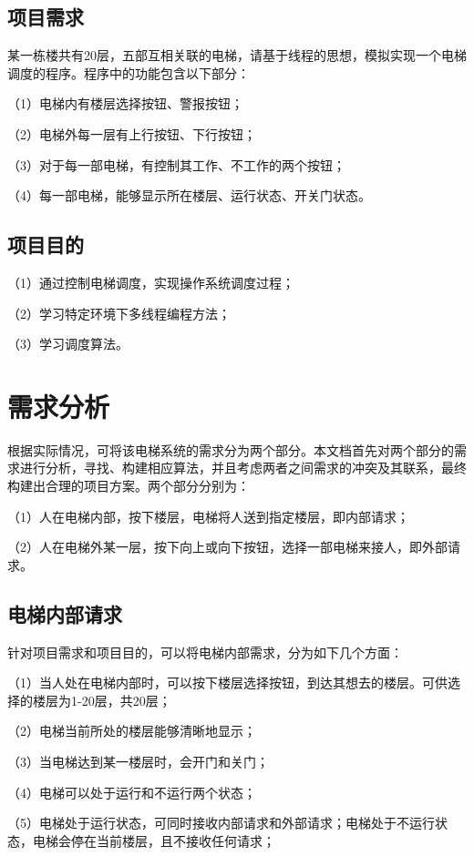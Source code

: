 \documentclass{article}
\begin{document}
\begin{CJK}{UTF8}{gbsn}
\subsection{项目需求}
某一栋楼共有20层，五部互相关联的电梯，请基于线程的思想，模拟实现一个电梯调度的程序。程序中的功能包含以下部分：

（1）电梯内有楼层选择按钮、警报按钮；

（2）电梯外每一层有上行按钮、下行按钮；

（3）对于每一部电梯，有控制其工作、不工作的两个按钮；

（4）每一部电梯，能够显示所在楼层、运行状态、开关门状态。


\subsection{项目目的}

（1）通过控制电梯调度，实现操作系统调度过程；

（2）学习特定环境下多线程编程方法；

（3）学习调度算法。

\vspace{3em}

\section{需求分析}
根据实际情况，可将该电梯系统的需求分为两个部分。本文档首先对两个部分的需求进行分析，寻找、构建相应算法，并且考虑两者之间需求的冲突及其联系，最终构建出合理的项目方案。两个部分分别为：

（1）人在电梯内部，按下楼层，电梯将人送到指定楼层，即内部请求；

（2）人在电梯外某一层，按下向上或向下按钮，选择一部电梯来接人，即外部请求。

\subsection{电梯内部请求}
针对项目需求和项目目的，可以将电梯内部需求，分为如下几个方面：

（1）当人处在电梯内部时，可以按下楼层选择按钮，到达其想去的楼层。可供选择的楼层为1-20层，共20层；

（2）电梯当前所处的楼层能够清晰地显示；

（3）当电梯达到某一楼层时，会开门和关门；

（4）电梯可以处于运行和不运行两个状态；

（5）电梯处于运行状态，可同时接收内部请求和外部请求；电梯处于不运行状态，电梯会停在当前楼层，且不接收任何请求；


\end{CJK}
\end{document}
